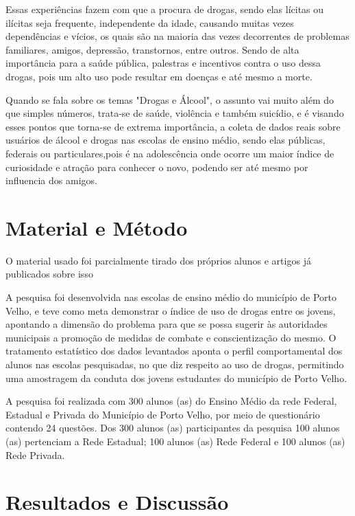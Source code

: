 \documentclass[article,12pt,onesidea,4paper,english,brazil]{abntex2}
\begin{document}
Essas experiências fazem com que a procura de drogas, sendo elas lícitas ou ilícitas seja frequente, independente da idade, causando muitas vezes dependências e vícios, os quais são na maioria das vezes decorrentes de problemas familiares, amigos, depressão, transtornos, entre outros. Sendo de alta importância para a saúde pública, palestras e incentivos contra o uso dessa drogas, pois um alto uso pode resultar em doenças e até mesmo a morte.

Quando se fala sobre os temas "Drogas e Álcool", o assunto vai muito além do que simples números, trata-se de saúde, violência e também suicídio, e é visando esses pontos que torna-se de extrema importância, a coleta de dados reais sobre usuários de álcool e drogas nas escolas de ensino médio, sendo elas públicas, federais ou particulares,pois é na adolescência onde ocorre um maior índice de curiosidade e atração para conhecer o novo, podendo ser até mesmo por influencia dos amigos.


	
	\section*{Material e Método}
	
O material usado foi parcialmente tirado dos próprios alunos e artigos já publicados sobre isso

A pesquisa foi desenvolvida nas escolas de ensino médio do município de Porto Velho, e teve como meta demonstrar o índice de uso de drogas entre os jovens, apontando a dimensão do problema para que se possa sugerir às autoridades municipais a promoção de medidas de combate e conscientização do mesmo. O tratamento estatístico dos dados levantados aponta o perfil comportamental dos alunos nas escolas pesquisadas, no que diz respeito ao uso de drogas, permitindo uma amostragem da conduta dos jovens estudantes do município de Porto Velho.

A pesquisa foi realizada com 300 alunos (as) do Ensino Médio da rede Federal, Estadual e Privada do Município de Porto Velho, por meio de questionário contendo 24 questões. Dos 300 alunos (as) participantes da pesquisa 100 alunos (as) pertenciam a Rede Estadual; 100 alunos (as) Rede Federal e 100 alunos (as) Rede Privada.
	
	\section*{Resultados e Discussão}
	
\end{document}
